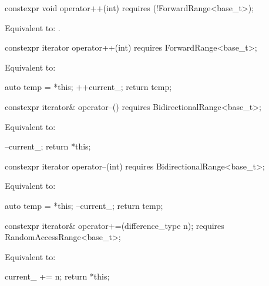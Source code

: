 \begin{itemdecl}
constexpr void operator++(int) requires (!ForwardRange<base_t>);
\end{itemdecl}

\begin{itemdescr}
\pnum
\effects
Equivalent to: .
\end{itemdescr}

\begin{itemdecl}
constexpr iterator operator++(int) requires ForwardRange<base_t>;
\end{itemdecl}

\begin{itemdescr}
\pnum
\effects Equivalent to:
\begin{codeblock}
auto temp = *this;
++current_;
return temp;
\end{codeblock}
\end{itemdescr}

\begin{itemdecl}
constexpr iterator& operator--() requires BidirectionalRange<base_t>;
\end{itemdecl}

\begin{itemdescr}
\pnum
\effects
Equivalent to:
\begin{codeblock}
--current_;
return *this;
\end{codeblock}
\end{itemdescr}

\begin{itemdecl}
constexpr iterator operator--(int) requires BidirectionalRange<base_t>;
\end{itemdecl}

\begin{itemdescr}
\pnum
\effects
Equivalent to:
\begin{codeblock}
auto temp = *this;
--current_;
return temp;
\end{codeblock}
\end{itemdescr}

\begin{itemdecl}
constexpr iterator& operator+=(difference_type n);
  requires RandomAccessRange<base_t>;
\end{itemdecl}

\begin{itemdescr}
\pnum
\effects
Equivalent to:
\begin{codeblock}
current_ += n;
return *this;
\end{codeblock}
\end{itemdescr}

